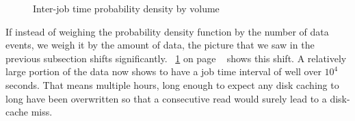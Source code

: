 \begin{figure}
\centering
{}
\hspace{0mm}
\caption{Inter-job time probability density by volume}
\label{fig:InterJobBySize}
\end{figure}
If instead of weighing the probability density function by the number of data events, we weigh it by the amount of data, the picture that we saw in the previous subsection shifts significantly. ~\ref{fig:InterJobBySize} on page ~\pageref{fig:InterJobBySize} shows this shift. A relatively large portion of the data now shows to have a job time interval of well over $10^4$ seconds. That means multiple hours, long enough to expect any disk caching to long have been overwritten so that a consecutive read would surely lead to a disk-cache miss.
